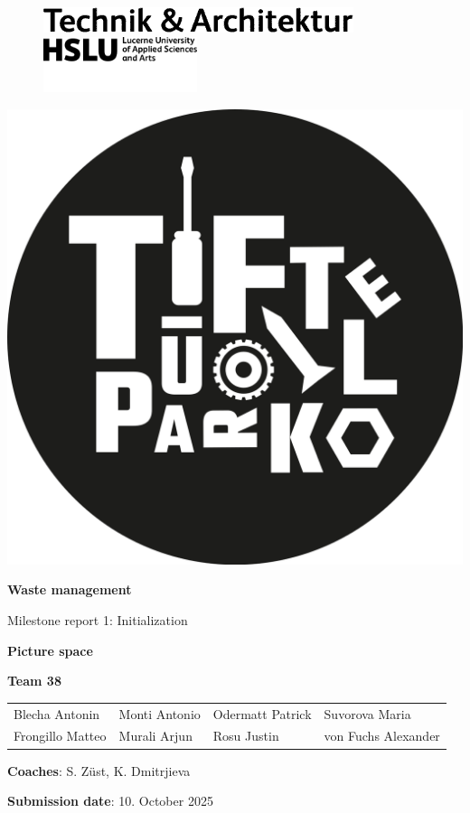 \documentclass{article}
\begin{document}
\hypersetup{citecolor=black}

\begin{titlepage}
    \begin{figure}
        \hspace*{.01cm}
        \includegraphics[width=.3\textwidth]{media/hslu-logo-2.png}

        \vspace*{.01cm}
        \hspace*{.16cm}\includegraphics[width=0.4\textwidth]{media/hslu-svg-logo.png}
    \end{figure}

    \phantom{}
    \vspace*{-1cm}

    \begin{flushright}
        \includegraphics[width=.225\textwidth]{media/tuefterpark_logo.png}
    \end{flushright}

    \wrapfill

    \vspace*{-3.5cm}
    {\huge \textbf{Waste management}}

    {\Large Milestone report 1: Initialization}

    \vspace*{3cm}
    \begin{center}
        {\Huge \textbf{Picture space}}
    \end{center}

    \vfill
    {\Large \textbf{Team 38}}\\[1em]
    \renewcommand{\arraystretch}{2}
    \begin{tabularx}{\textwidth}{>{\large}p{}>{\large}p{}>{\large}p{}>{\large}p{}}
    Blecha Antonin & Monti Antonio & Odermatt Patrick & Suvorova Maria \\
    Frongillo Matteo & Murali Arjun & Rosu Justin & von Fuchs Alexander
    \end{tabularx}
    \renewcommand{\arraystretch}{1}
    \vspace{.5cm}

    \large{\textbf{Coaches}: S. Züst, K. Dmitrjieva} 
    \vspace{.5cm}
    
    \large{\textbf{Submission date}: 10. October 2025}
\end{titlepage}
\end{document}
